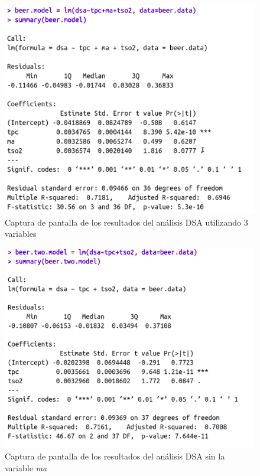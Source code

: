 \documentclass{article}
\begin{document}
\begin{figure}[htbp]
    \centering
    \includegraphics[scale=0.4]{images/dsa_analisis_3_variables.png}
    \caption{Captura de pantalla de los resultados del análisis DSA utilizando 3 variables}
    \label{fig:dsa_3_variables}
\end{figure}


\begin{figure}[htbp]
    \centering
    \includegraphics[scale=0.4]{images/dsa_analisis_2_variables.png}
    \caption{Captura de pantalla de los resultados del análisis DSA sin la variable \textit{ma}}
    \label{fig:dsa_2_variables}
\end{figure}
\end{document}
